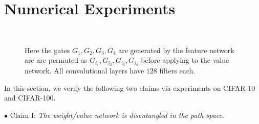 \section{Numerical Experiments}\label{sec:dlgn}
\begin{comment}
\begin{figure}[!b]
\centering
\begin{minipage}{0.95\columnwidth}
\centering
\resizebox{0.99\columnwidth}{!}{

}
\end{minipage}
\caption{\small{Here the gates $G_1,G_2,G_3,G_4$ are generated by the feature network are are permuted as $G_{i_1},G_{i_2},G_{i_3},G_{i_4}$ before applying to the value network. All convolutional layers have $128$ filters each.}}
\label{fig:c4gap}
\end{figure}
\end{comment}
\begin{figure}[!b]
\centering
\begin{minipage}{0.6\columnwidth}
\centering
\resizebox{0.99\columnwidth}{!}{

}
\end{minipage}
\\
\begin{minipage}{0.48\columnwidth}
\centering
\resizebox{0.99\columnwidth}{!}{

}
\end{minipage}
\begin{minipage}{0.48\columnwidth}
\centering
\resizebox{0.99\columnwidth}{!}{

}
\end{minipage}
%
%
\caption{\small{Here the gates $G_1,G_2,G_3,G_4$ are generated by the feature network are are permuted as $G_{i_1},G_{i_2},G_{i_3},G_{i_4}$ before applying to the value network. All convolutional layers have $128$ filters each.}}
\label{fig:c4gap}
\end{figure}
In this section, we verify the following two claims via experiments on CIFAR-10 and CIFAR-100.

$\bullet$ Claim I: \emph{The weight/value network is disentangled in the path space}. 

